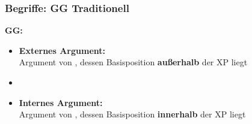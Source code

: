 \begin{frame}
\frametitle{Begriffe: GG \vs Traditionell}

\begin{minipage}[b]{0.47\textwidth}

	\textbf{GG:}
	\begin{itemize}
		\item \textbf{Externes Argument:}\\
		Argument von , dessen Basisposition \textbf{außerhalb} der XP liegt
		\item[]
		\item \textbf{Internes Argument:}\\
		Argument von , dessen Basisposition \textbf{innerhalb} der XP liegt
	\end{itemize}	
\end{minipage}  
\begin{minipage}[b]{0.48\textwidth}
	\begin{figure}
	\centering
	\end{figure}	
\end{minipage}

\end{frame}


